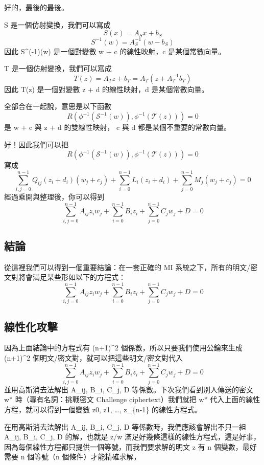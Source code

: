 \documentclass[
]{article}
\begin{document}
好的，最後的最後。

S 是一個仿射變換，我們可以寫成 \[
S(x) = A_{S}x+b_{S}
\] \[
S^{-1}(w) =A_{S}^{-1} (w - b_{S})
\] 因此 S\^{}(-1)(w) 是一個對變數 w + c 的線性映射，c 是某個常數向量。

T 是一個仿射變換，我們可以寫成 \[
T(z) =A_{T}z +b_{T} =A_{T}(z + A_{T}^{-1}b_{T})
\] 因此 T(z) 是一個對變數 z + d 的線性映射，d 是某個常數向量。

全部合在一起說，意思是以下函數 \[
R(\phi^{-1}(\mathcal{S}^{-1}(w)) , \phi^{-1}(\mathcal{T}(z))) = 0
\] 是 w + c 與 z + d 的雙線性映射， c 與 d 都是某個不重要的常數向量。

好！因此我們可以把 \[
R(\phi^{-1}(\mathcal{S}^{-1}(w)) , \phi^{-1}(\mathcal{T}(z))) = 0
\] 寫成 \[
\sum_{i,j=0}^{n-1} Q_{ij}(z_{i}+d_{i})(w_{j}+c_{j}) + 
\sum_{i=0}^{n-1} L_{i}(z_{i}+d_{i}) +
\sum_{j=0}^{n-1} M_{j}(w_{j}+c_{j}) = 0
\] 經過乘開與整理後，你可以得到 \[
\sum_{i,j=0}^{n-1} A_{ij}z_{i}w_{j} + 
\sum_{i=0}^{n-1} B_{i}z_{i} + 
\sum_{j=0}^{n-1} C_{j}w_{j} + D =0 
\]

\hypertarget{ux7d50ux8ad6}{%
\subsection{結論}\label{ux7d50ux8ad6}}

從這裡我們可以得到一個重要結論：在一套正確的 MI
系統之下，所有的明文/密文對將會滿足某些形如以下的方程式： \[
\sum_{i,j=0}^{n-1} A_{ij}z_{i}w_{j} + 
\sum_{i=0}^{n-1} B_{i}z_{i} + 
\sum_{j=0}^{n-1} C_{j}w_{j} + D =0 
\]

\hypertarget{ux7ddaux6027ux5316ux653bux64ca}{%
\subsection{線性化攻擊}\label{ux7ddaux6027ux5316ux653bux64ca}}

因為上面結論中的方程式有 (n+1)\^{}2 個係數，所以只要我們使用公鑰來生成
(n+1)\^{}2 個明文/密文對，就可以把這些明文/密文對代入 \[
\sum_{i,j=0}^{n-1} A_{ij}z_{i}w_{j} + 
\sum_{i=0}^{n-1} B_{i}z_{i} + 
\sum_{j=0}^{n-1} C_{j}w_{j} + D =0 
\] 並用高斯消去法解出 A\_ij, B\_i, C\_j, D
等係數。下次我們看到別人傳送的密文 w* 時（專有名詞：挑戰密文 Challenge
ciphertext）我們就把 w* 代入上面的線性方程，就可以得到一個變數 z0, z1,
\ldots, z\_\{n-1\} 的線性方程式。

在用高斯消去法解出 A\_ij, B\_i, C\_j, D 等係數時，我們應該會解出不只一組
A\_ij, B\_i, C\_j, D 的解，也就是 z/w
滿足好幾條這樣的線性方程式，這是好事，因為每個線性方程都只提供一個等號，而我們要求解的明文
z 有 n 個變數，最好需要 n 個等號（n 個條件）才能精確求解，
\end{document}
